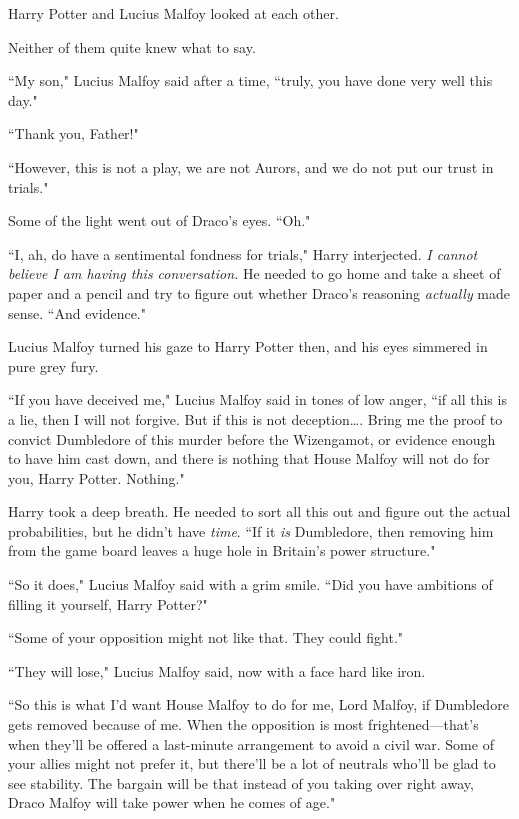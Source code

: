 Harry Potter and Lucius Malfoy looked at each other.

Neither of them quite knew what to say.

``My son," Lucius Malfoy said after a time, ``truly, you have done very well this day."

``Thank you, Father!"

``However, this is not a play, we are not Aurors, and we do not put our trust in trials."

Some of the light went out of Draco's eyes. ``Oh."

``I, ah, do have a sentimental fondness for trials," Harry interjected. \emph{I cannot believe I am having this conversation.} He needed to go home and take a sheet of paper and a pencil and try to figure out whether Draco's reasoning \emph{actually} made sense. ``And evidence."

Lucius Malfoy turned his gaze to Harry Potter then, and his eyes simmered in pure grey fury.

``If you have deceived me," Lucius Malfoy said in tones of low anger, ``if all this is a lie, then I will not forgive. But if this is not deception{\ldots}. Bring me the proof to convict Dumbledore of this murder before the Wizengamot, or evidence enough to have him cast down, and there is nothing that House Malfoy will not do for you, Harry Potter. Nothing."

Harry took a deep breath. He needed to sort all this out and figure out the actual probabilities, but he didn't have \emph{time}. ``If it \emph{is} Dumbledore, then removing him from the game board leaves a huge hole in Britain's power structure."

``So it does," Lucius Malfoy said with a grim smile. ``Did you have ambitions of filling it yourself, Harry Potter?"

``Some of your opposition might not like that. They could fight."

``They will lose," Lucius Malfoy said, now with a face hard like iron.

``So this is what I'd want House Malfoy to do for me, Lord Malfoy, if Dumbledore gets removed because of me. When the opposition is most frightened—that's when they'll be offered a last-minute arrangement to avoid a civil war. Some of your allies might not prefer it, but there'll be a lot of neutrals who'll be glad to see stability. The bargain will be that instead of you taking over right away, Draco Malfoy will take power when he comes of age."

